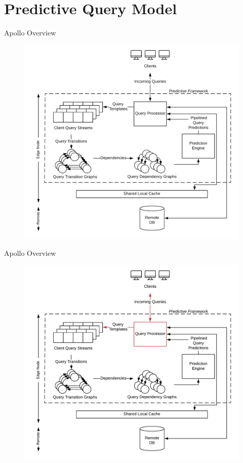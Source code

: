 \documentclass[10pt]{beamer}
\begin{document}
\section{Predictive Query Model}

\begin{frame}[fragile]{Apollo Overview}
    \begin{figure}
        \hspace*{-1cm}
        \includegraphics[scale=0.13]{apollo_overview}
    \end{figure}
\end{frame}

\begin{frame}[fragile]{Apollo Overview}
    \begin{figure}
        \hspace*{-1cm}
        \includegraphics[scale=0.13]{apollo_overview_2}
    \end{figure}
\end{frame}
\end{document}
